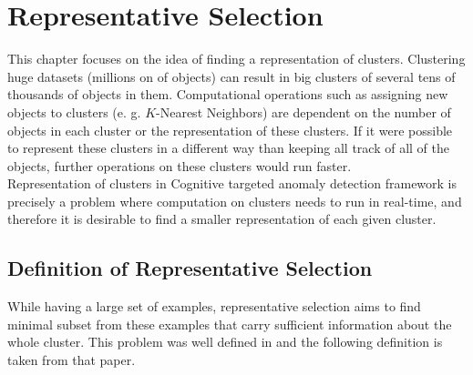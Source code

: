 \documentclass[thesis=B,english]{FITthesis}[2012/10/20]
\begin{document}


\chapter{Representative Selection}

This chapter focuses on the idea of finding a representation of clusters.
Clustering huge datasets (millions on of objects) can result in big clusters of several tens of thousands of objects in them.
Computational operations such as assigning new objects to clusters (e. g. $K$-Nearest Neighbors) are dependent on the number of objects in each cluster or the representation of these clusters.
If it were possible to represent these clusters in a different way than keeping all track of all of the objects, further operations on these clusters would run faster. \\

Representation of clusters in Cognitive targeted anomaly detection framework is precisely a problem where computation on clusters needs to run in real-time, and therefore it is desirable to find a smaller representation of each given cluster.

\section{Definition of Representative Selection}\label{sec:def_rep_selection}
While having a large set of examples, representative selection aims to find minimal subset from these examples that carry sufficient information about the whole cluster.
This problem was well defined in \cite{liebman2015representative} and the following definition is taken from that paper.
\end{document}
